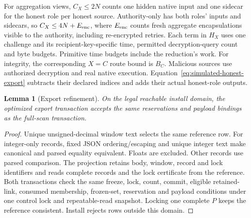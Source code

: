 \documentclass[conference,compsoc]{IEEEtran}
\theoremstyle{definition}
\numberwithin{equation}{section}
\numberwithin{table}{section}
\numberwithin{figure}{section}
\theoremstyle{plain}
\newtheorem{lemma}{Lemma}[section]
\newtheorem{lemma}{Lemma}
\begin{document}
For aggregation views, \(C_X\le2N\) counts one hidden native input and one
sidecar for the honest role per honest source. Authority-only has both roles'
inputs and sidecars, so \(C_X\le4N+E_{\rm enc}\), where \(E_{\rm enc}\) counts
fresh aggregate encapsulations visible to the authority, including re-encrypted
retries. Each term in \(H_X\) uses one challenge and its recipient-key-specific
time, permitted decryption-query count and byte budgets. Primitive time
budgets include the reduction's work. For integrity, the
corresponding \(X=C\) route bound is \(B_C\). Malicious
sources use authorized decryption and real native execution. Equation~\eqref{eq:simulated-honest-export}
subtracts their declared indices and adds their actual honest-role outputs.


\begin{lemma}[Export refinement]
\label{lem:export-refinement}
On the legal reachable install domain, the optimized export transaction
accepts the same reservations and payload bindings as the full-scan
transaction.
\end{lemma}
\begin{proof}
Unique unsigned-decimal window text selects the same reference row. For
integer-only records, fixed JSON ordering/escaping and unique integer text make
canonical and parsed equality equivalent. Floats are excluded. Other records
use parsed comparison. The projection retains body, window, record and lock
identifiers and reads complete records and the lock certificate from the reference.
Both transactions check the same freeze, lock, count, commit, eligible retained-link,
consumed membership, frozen-set, reservation and payload conditions under one control
lock and repeatable-read snapshot. Locking one complete \(P\) keeps the reference consistent. Install rejects
rows outside this domain.
\end{proof}
\end{document}

